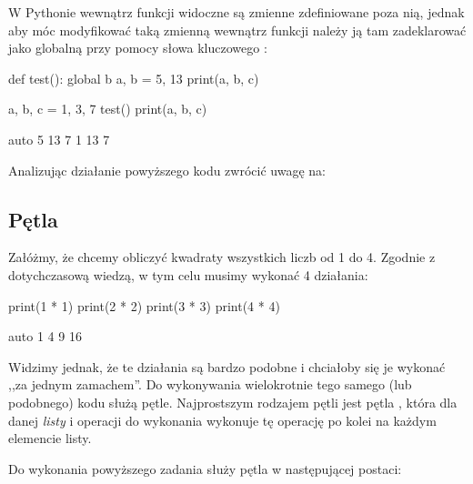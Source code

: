 \documentclass{pdfBooklets}
\begin{document}
W Pythonie wewnątrz funkcji widoczne są zmienne zdefiniowane poza nią, jednak aby móc modyfikować taką zmienną wewnątrz
funkcji należy ją tam zadeklarować jako globalną przy pomocy słowa kluczowego :

\begin{CodeFrame}[python]{.5\textwidth}
def test():
  global b
  a, b = 5, 13
  print(a, b, c)

a, b, c = 1, 3, 7
test()
print(a, b, c)
\end{CodeFrame}
\begin{CodeFrame}{auto}
5 13 7
1 13 7
\end{CodeFrame}

\noindent
Analizując działanie powyższego kodu zwrócić uwagę na:

\subsection{Pętla }
Załóżmy, że chcemy obliczyć kwadraty wszystkich liczb od 1 do 4.
Zgodnie z dotychczasową wiedzą, w tym celu musimy wykonać 4 działania:

\begin{CodeFrame}[python]{.5\textwidth}
print(1 * 1)
print(2 * 2)
print(3 * 3)
print(4 * 4)
\end{CodeFrame}
\begin{CodeFrame}{auto}
1
4
9
16
\end{CodeFrame}

Widzimy jednak, że te działania są bardzo podobne i chciałoby się je wykonać ,,za jednym zamachem''.
Do wykonywania wielokrotnie tego samego (lub podobnego) kodu służą pętle.
Najprostszym rodzajem pętli jest pętla , która dla danej \emph{listy} i operacji do wykonania
wykonuje tę operację po kolei na każdym elemencie listy.

Do wykonania powyższego zadania służy pętla  w następującej postaci:
\end{document}
